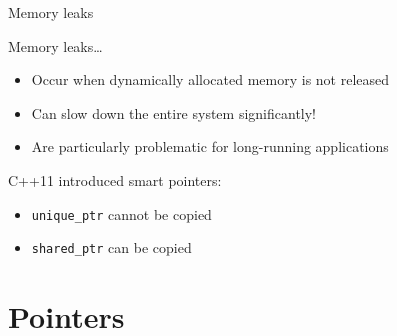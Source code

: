 \begin{frame}[fragile]{Memory leaks}
    \begin{block}{Memory leaks\ldots}
        \begin{itemize}
            \item Occur when dynamically allocated memory is not released
            \item Can slow down the entire system significantly!
            \item Are particularly problematic for long\hyp{}running
                  applications
        \end{itemize}
    \end{block}
    \begin{block}{C++11 introduced \alert{smart pointers}:}
        \begin{itemize}
            \item \texttt{unique_ptr} cannot be copied
            \item \texttt{shared_ptr} can be copied
        \end{itemize}
    \end{block}
\end{frame}

\section{Pointers}

